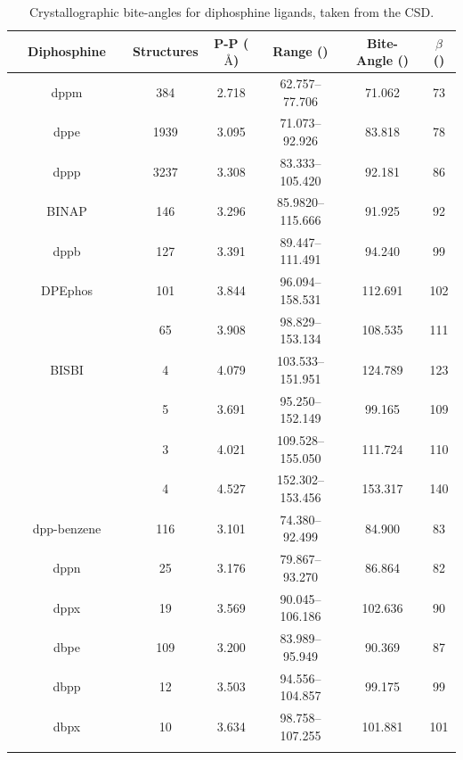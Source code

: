 \begin{table}[htbp]
\small
\caption[Crystallographic bite-angles for diphosphine ligands]{Crystallographic bite-angles for diphosphine ligands, taken from the \gls{CSD}.\cite{Allen2002}} 
\label{table:biteangles}
\begin{center}
\begin{tabular}{c c c c c c}
	\toprule
	~~\bfseries{Diphosphine}~~ & \bfseries{Structures} & \bfseries{P-P ($\si{\angstrom}$)} & \bfseries{Range (\degrees)} & \bfseries{Bite-Angle (\degrees)} & \bfseries{$\beta$\sub{n} (\degrees)}\\
	\midrule
	dppm			& 384	& 2.718	& 62.757--77.706 	& 71.062 	& 73	\\
	dppe				& 1939	& 3.095	& 71.073--92.926	& 83.818	& 78 \\
	dppp				& 3237	& 3.308	& 83.333--105.420	& 92.181	& 86 \\ 
	BINAP			& 146	& 3.296	& 85.9820--115.666	& 91.925	& 92 \\
	dppb				& 127	& 3.391	& 89.447--111.491	& 94.240	& 99 \\
	DPEphos			& 101	& 3.844	& 96.094--158.531	& 112.691	& 102 \\
	\PhXantphos		& 65		& 3.908	& 98.829--153.134	& 108.535	& 111 \\
	BISBI			& 4		& 4.079	& 103.533--151.951	& 124.789 & 123 \\
	\PhSixantphos		& 5		& 3.691 	& 95.250--152.149	& 99.165 & 109 \\
	\PhThixantphos		& 3		& 4.021	& 109.528--155.050	& 111.724	& 110 \\
	\tBuxantphos		& 4		& 4.527	& 152.302--153.456 & 153.317 & 140 \\
	dpp-benzene		& 116	& 3.101	& 74.380--92.499	& 84.900	& 83\\
	dppn				& 25		& 3.176	& 79.867--93.270	& 86.864	& 82 \\
	dppx				& 19		& 3.569	& 90.045--106.186	& 102.636	& 90 \\
	dbpe				& 109	& 3.200	& 83.989--95.949	& 90.369	& 87	\\
	dbpp				& 12		& 3.503	& 94.556--104.857	& 99.175	& 99	\\
	dbpx				& 10		& 3.634	& 98.758--107.255	& 101.881	& 101 \\
	\bottomrule{}
\end{tabular}
\end{center}
\end{table}

